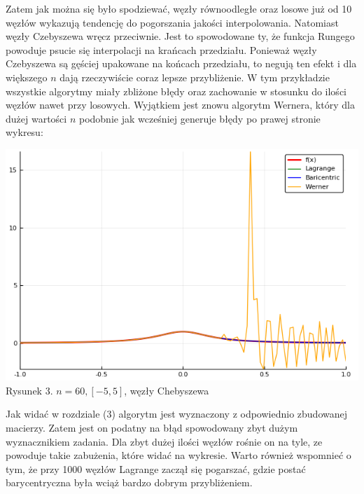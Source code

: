 \documentclass[11pt, wide]{article}
\begin{document}
Zatem jak można się było spodziewać, węzły równoodległe oraz losowe już od 10 węzłów wykazują
tendencję do pogorszania jakości interpolowania. Natomiast węzły Czebyszewa wręcz przeciwnie. 
Jest to spowodowane ty, że funkcja Rungego powoduje psucie się interpolacji na krańcach przedziału. 
Ponieważ węzły Czebyszewa są gęściej upakowane na końcach przedziału, to negują ten efekt i dla większego $n$ dają rzeczywiście
coraz lepsze przybliżenie. W tym przykładzie wszystkie algorytmy
miały zbliżone błędy oraz zachowanie w stosunku do ilości węzłów nawet przy losowych. Wyjątkiem jest znowu algorytm Wernera,
który dla dużej wartości $n$ podobnie jak wcześniej generuje błędy po prawej stronie wykresu:
\begin{center}
    \includegraphics[scale=0.4]{wykres3}\\
    Rysunek 3. $n = 60, [-5,5]$, węzły Chebyszewa
\end{center}
Jak widać w rozdziale (3) algorytm jest wyznaczony
z odpowiednio zbudowanej macierzy. Zatem jest on podatny na błąd spowodowany zbyt dużym 
wyznacznikiem zadania. Dla zbyt dużej ilości
węzłów rośnie on na tyle, ze powoduje takie zabużenia, które widać na wykresie. Warto również
wspomnieć o tym, że przy 1000 węzłów Lagrange zaczął się pogarszać, gdzie postać barycentryczna
była wciąż bardzo dobrym przybliżeniem.
\end{document}
